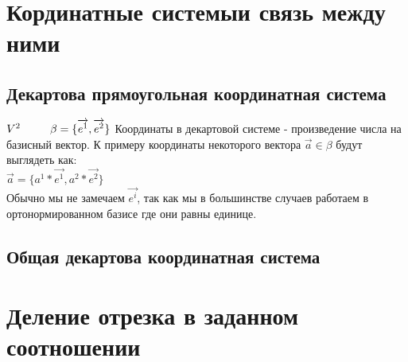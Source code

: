 \documentclass{book}
\begin{document}
\chapter{Кординатные системы и связь между ними}
\section{Декартова прямоугольная координатная система}
$V^2\ \ \ \ \ \ \ \ \beta=\{\overrightarrow{e^1},\overrightarrow{e^2}\}\\$
Координаты в декартовой системе - произведение числа на базисный вектор. К примеру координаты некоторого вектора $\overrightarrow{a} \in \beta$ будут выглядеть как:\\
$\overrightarrow{a}=\{a^1*\overrightarrow{e^1},a^2*\overrightarrow{e^2}\}$\\
Обычно мы не замечаем $\overrightarrow{e^i}$, так как мы в большинстве случаев работаем в ортонормированном базисе где они равны единице.
\begin{figure}[h!]
\end{figure}
\section{Общая декартова координатная система}
\newpage
\chapter{Деление отрезка в заданном соотношении}
\end{document}
